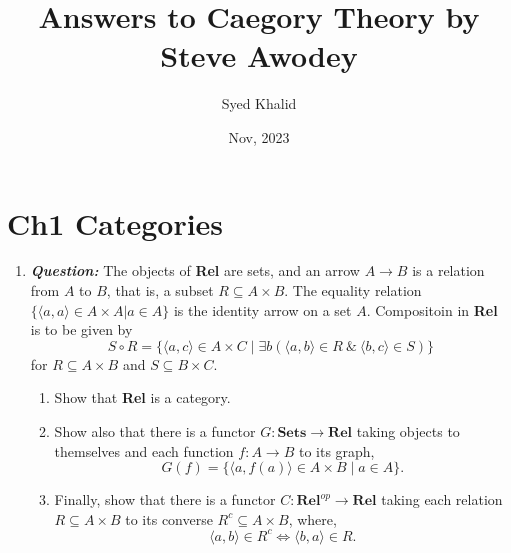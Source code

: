 \documentclass{article}
\begin{document}
\title{Answers to Caegory Theory by Steve Awodey}
\author{Syed Khalid}
\date{Nov, 2023}
\maketitle

\section{Ch1 Categories}

\begin{enumerate}
	\item
	      \textbf{\textit{Question:}} The objects of \textbf{Rel} are sets, and an arrow $ A \to B $ is a relation from $A$ to $B$, that is, a subset $R \subseteq A \times B$. The equality relation $\{\langle a,a \rangle \in A \times A | a \in A\}$ is the identity arrow on a set $A$. Compositoin in \textbf{Rel} is to be given by
	      \[
		      S \circ R = \{ \langle a, c \rangle \in A \times C \mid \exists b ( \langle a,b \rangle \in R \ \& \ \langle b,c \rangle \in S) \}
	      \]
	      for $R \subseteq A \times B$ and $S \subseteq B \times C$.
	      \begin{enumerate}
		      \item  Show that \textbf{Rel} is a category.
		      \item     Show also that there is a functor $G : \textbf{Sets} \to \textbf{Rel}$ taking objects to themselves and each function $f : A \to B$ to its graph,
		            \[
			            G(f) = \{ \langle a, f(a) \rangle \in A \times B \mid a \in A \}.
		            \]
		      \item  Finally, show that there is a functor $C : \textbf{Rel}^{op} \to \textbf{Rel}$ taking each relation $R \subseteq A \times B$ to its converse $R^c \subseteq A \times B$, where, \[
			            \langle a,b \rangle \in R^c \Leftrightarrow \langle b,a \rangle \in R.
		            \]
	      \end{enumerate}



\end{enumerate}
\end{document}
